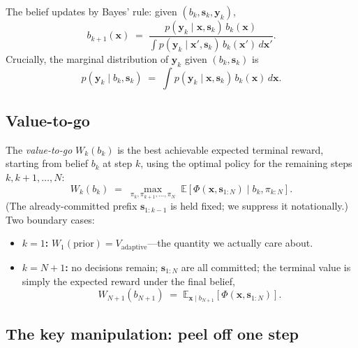 \documentclass[11pt,a4paper]{article}
\newcommand{\E}{\mathbb{E}}
\begin{document}
The belief updates by Bayes' rule: given $(b_k, \bm{s}_k, \bm{y}_k)$,
\begin{equation}
  b_{k+1}(\bm{x}) \;=\; \frac{p(\bm{y}_k \mid \bm{x}, \bm{s}_k)\, b_k(\bm{x})}{\int p(\bm{y}_k \mid \bm{x}', \bm{s}_k)\, b_k(\bm{x}')\, d\bm{x}'}.
  \label{eq:app:bayes}
\end{equation}
Crucially, the marginal distribution of $\bm{y}_k$ given $(b_k, \bm{s}_k)$ is
\begin{equation}
  p(\bm{y}_k \mid b_k, \bm{s}_k) \;=\; \int p(\bm{y}_k \mid \bm{x}, \bm{s}_k)\, b_k(\bm{x})\, d\bm{x}.
  \label{eq:app:marginal}
\end{equation}

\subsection{Value-to-go}

The \emph{value-to-go} $W_k(b_k)$ is the best achievable expected terminal reward, starting from belief $b_k$ at step $k$, using the optimal policy for the remaining steps $k, k+1, \ldots, N$:
\begin{equation}
  W_k(b_k) \;=\; \max_{\pi_k, \pi_{k+1}, \ldots, \pi_N}\; \E\!\left[\Phi(\bm{x}, \bm{s}_{1:N}) \mid b_k, \pi_{k:N}\right].
  \label{eq:app:vtg_def}
\end{equation}
(The already-committed prefix $\bm{s}_{1:k-1}$ is held fixed; we suppress it notationally.)  Two boundary cases:
\begin{itemize}[nosep]
  \item \textbf{$k = 1$:} $W_1(\text{prior}) = V_{\text{adaptive}}$---the quantity we actually care about.
  \item \textbf{$k = N+1$:} no decisions remain; $\bm{s}_{1:N}$ are all committed; the terminal value is simply the expected reward under the final belief,
  \begin{equation}
    W_{N+1}(b_{N+1}) \;=\; \E_{\bm{x} \mid b_{N+1}}\!\left[\Phi(\bm{x}, \bm{s}_{1:N})\right].
    \label{eq:app:terminal}
  \end{equation}
\end{itemize}

\subsection{The key manipulation: peel off one step}
\end{document}
